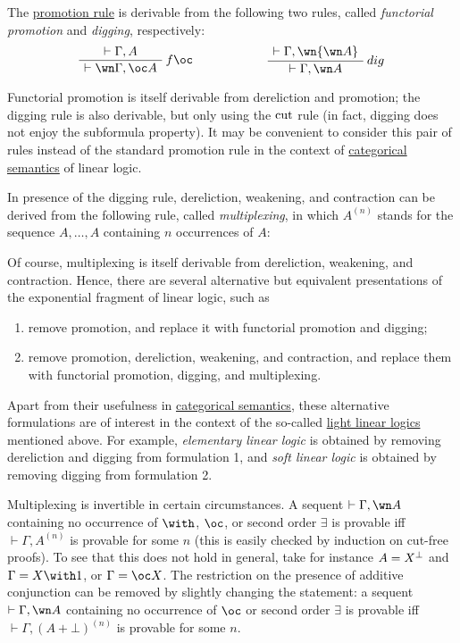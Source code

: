 The \hyperref[sequents-and-proofs]{promotion rule} is
derivable from the following two rules, called \emph{functorial
promotion} and \emph{digging}, respectively:
\begin{equation*}
\AxRule{\vdash\Gamma,A}
\LabelRule{f\oc}
\UnaRule{\vdash\wn\Gamma,\oc A}
\DisplayProof
\qquad\qquad\qquad
\AxRule{\vdash\Gamma,\wn{\wn A}}
\LabelRule{dig}
\UnaRule{\vdash\Gamma,\wn A}
\DisplayProof
\end{equation*}

Functorial promotion is itself derivable from dereliction and promotion;
the digging rule is also derivable, but only using the
\(\rulename{cut}\) rule (in fact, digging does not enjoy the subformula
property). It may be convenient to consider this pair of rules instead
of the standard promotion rule in the context of
\hyperref[categorical-semantics]{categorical semantics} of linear logic.

In presence of the digging rule, dereliction, weakening, and contraction
can be derived from the following rule, called \emph{multiplexing}, in
which \(A^{(n)}\) stands for the sequence \(A,\ldots,A\) containing
\(n\) occurrences of \(A\):
\begin{prooftree}
\end{prooftree}

Of course, multiplexing is itself derivable from dereliction, weakening,
and contraction. Hence, there are several alternative but equivalent
presentations of the exponential fragment of linear logic, such as
\begin{enumerate}
\item remove promotion, and replace it with functorial promotion and
  digging;
\item remove promotion, dereliction, weakening, and contraction, and replace
  them with functorial promotion, digging, and multiplexing.
\end{enumerate}

Apart from their usefulness in \hyperref[categorical-semantics]{categorical
semantics}, these alternative formulations are of interest in the
context of the so-called \hyperref[light-linear-logics]{light linear logics}
mentioned above. For example, \emph{elementary linear logic} is obtained
by removing dereliction and digging from formulation 1, and \emph{soft
linear logic} is obtained by removing digging from formulation 2.

Multiplexing is invertible in certain circumstances. A sequent
\(\vdash\Gamma,\wn A\) containing no occurrence of \(\with\), \(\oc\),
or second order \(\exists\) is provable iff \(\vdash\Gamma,A^{(n)}\) is
provable for some \(n\) (this is easily checked by induction on cut-free
proofs). To see that this does not hold in general, take for instance
\(A=X\orth\) and \(\Gamma=X\with\one\), or \(\Gamma=\oc X\). The
restriction on the presence of additive conjunction can be removed by
slightly changing the statement: a sequent \(\vdash\Gamma,\wn A\)
containing no occurrence of \(\oc\) or second order \(\exists\) is
provable iff \(\vdash\Gamma,(A\plus\bot)^{(n)}\) is provable for some
\(n\).

